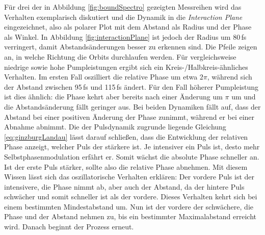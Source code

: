 \documentclass[bachelor,       %
               twoside,        %
               BCOR10mm,       %
               liststotoc,nomtotoc,bibtotoc, %
               english,ngerman, %
               final,          %
               ]{GAUBM}
\begin{document}
Für drei der in Abbildung \ref{fig:boundSpectro} gezeigten Messreihen wird das Verhalten exemplarisch diskutiert und die Dynamik in die \textit{Interaction Plane} eingezeichnet, also als polarer Plot mit dem Abstand als Radius und der Phase als Winkel.
In Abbildung \ref{fig:interactionPlane} ist jedoch der Radius um 80\,fs verringert, damit Abstandsänderungen besser zu erkennen sind.
Die Pfeile zeigen an, in welche Richtung die Orbits durchlaufen werden.
Für vergleichsweise niedrige sowie hohe Pumpleistungen ergibt sich ein Kreis-/Halbkreis-ähnliches Verhalten.
Im ersten Fall oszilliert die relative Phase um etwa $2\pi$, während sich der Abstand zwischen 95\,fs und 115\,fs ändert.
Für den Fall höherer Pumpleistung ist dies ähnlich: die Phase kehrt aber bereits nach einer Änderung um $\pi$ um und die Abstandsänderung fällt geringer aus.
Bei beiden Dynamiken fällt auf, dass der Abstand bei einer positiven Änderung der Phase zunimmt, während er bei einer Abnahme abnimmt.
Die der Pulsdynamik zugrunde liegende Gleichung \eqref{eq:ginzburgLandau} lässt darauf schließen, dass die Entwicklung der relativen Phase anzeigt, welcher Puls der stärkere ist.
Je intensiver ein Puls ist, desto mehr Selbstphasenmodulation erfährt er.
Somit wächst die absolute Phase schneller an.
Ist der erste Puls stärker, sollte also die relative Phase abnehmen.
Mit diesem Wissen lässt sich das oszillatorische Verhalten erklären:
Der vordere Puls ist der intensivere, die Phase nimmt ab, aber auch der Abstand, da der hintere Puls schwächer und somit schneller ist als der vordere.
Dieses Verhalten kehrt sich bei einem bestimmten Mindestabstand um.
Nun ist der vordere der schwächere, die Phase und der Abstand nehmen zu, bis ein bestimmter Maximalabstand erreicht wird.
Danach beginnt der Prozess erneut.
\end{document}
